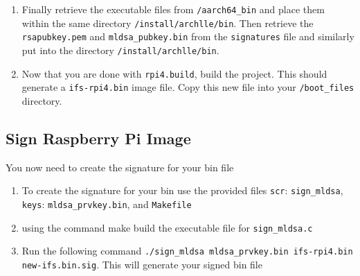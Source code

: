 \documentclass[12pt]{article}
\begin{document}
\begin{enumerate}
\begin{itemize}
        \item Creates a backup of the current image as ifs-rpi4.bin.bak
        \item Copies the new image into a temporary staged file, \texttt{ifs-rpi4.bin.new}.
        \item Replaces the active boot image with the staged one, then syncs to flush writes to disk.
        \item Stops the sampler and parses the recorded top output to calculate:total OTA time, average CPU. maximum CPU, average RAM, maximum RAM
        \item Writes those results to ota\_summary.log and raw sample data to ota\_samples.csv.
    \end{itemize}
    \item Finally retrieve the executable files from \texttt{/aarch64\_bin} and place them within the same directory \texttt{/install/archlle/bin}. Then retrieve the \texttt{rsapubkey.pem} and \texttt{mldsa\_pubkey.bin} from the \texttt{signatures} file and similarly put into the directory \texttt{/install/archlle/bin}. 
    \item Now that you are done with \texttt{rpi4.build}, build the project. This should generate a \texttt{ifs-rpi4.bin} image file. Copy this new file into your \texttt{/boot\_files} directory.
\end{enumerate}
\subsection{Sign Raspberry Pi Image}
You now need to create the signature for your bin file
\begin{enumerate}
    \item To create the signature for your bin use the provided files \texttt{scr}: \texttt{sign\_mldsa}, \texttt{keys}: \texttt{mldsa\_prvkey.bin}, and \texttt{Makefile}
    \item using the command make build the executable file for \texttt{sign\_mldsa.c}
    \item Run the following command \texttt{./sign\_mldsa mldsa\_prvkey.bin ifs-rpi4.bin new-ifs.bin.sig}. This will generate your signed bin file
\end{enumerate}
\end{document}
